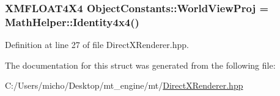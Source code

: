 \subsubsection[{\texorpdfstring{World\+View\+Proj}{WorldViewProj}}]{\setlength{\rightskip}{0pt plus 5cm}X\+M\+F\+L\+O\+A\+T4\+X4 Object\+Constants\+::\+World\+View\+Proj = {\bf Math\+Helper\+::\+Identity4x4}()}\hypertarget{struct_object_constants_a274b083a5402569466d1e86844ab4dec_a274b083a5402569466d1e86844ab4dec}{}\label{struct_object_constants_a274b083a5402569466d1e86844ab4dec_a274b083a5402569466d1e86844ab4dec}


Definition at line 27 of file Direct\+X\+Renderer.\+hpp.



The documentation for this struct was generated from the following file\+:\begin{DoxyCompactItemize}
\item 
C\+:/\+Users/micho/\+Desktop/mt\+\_\+engine/mt/\hyperlink{_direct_x_renderer_8hpp}{Direct\+X\+Renderer.\+hpp}\end{DoxyCompactItemize}
